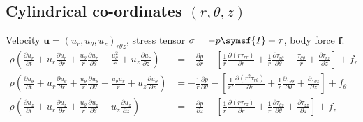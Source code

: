 \documentclass{jknotes}
\begin{document}
\subsection{Cylindrical co-ordinates $(r,\theta,z)$}
Velocity $\symbf{u} = (u_r, u_\theta, u_z)_{r\theta z}$, stress tensor $\sigma
= -p \symsf{I} + \tau$, body force $\symbf{f}$.
\begingroup
\addtolength{\jot}{.7em}
\begin{align}
	\rho\left(\frac{\partial u_r}{\partial t} + u_r \frac{\partial
	u_r}{\partial r} + \frac{u_\theta}{r} \frac{\partial u_r}{\partial \theta} 
	- \frac{u_\theta^2}{r} + u_z\frac{\partial u_r}{\partial z}\right) &= 
	-\frac{\partial p}{\partial r} - \left[ \frac{1}{r}
	\frac{\partial(r\tau_{rr})}{\partial r} + \frac{1}{r}\frac{\partial
	\tau_{r\theta}}{\partial \theta} - \frac{\tau_{\theta\theta}}{r} +
\frac{\partial \tau_{rz}}{\partial z}\right] + f_r \\[-1.4em]
	\rho\left(\frac{\partial u_\theta}{\partial t} + u_r \frac{\partial
	u_\theta}{\partial r} + \frac{u_\theta}{r}\frac{\partial u_\theta}{\partial
	\theta} + \frac{u_\theta u_r}{r} + u_z \frac{\partial
	u_\theta}{\partial z}\right) &= -\frac{1}{r} \frac{\partial p}{\partial
	\theta} - \left[\frac{1}{r^2}\frac{\partial (r^2 \tau_{r\theta})}{\partial
	r} + \frac{1}{r}\frac{\partial \tau_{\theta\theta}}{\partial \theta} +
	\frac{\partial \tau_{\theta z}}{\partial z} \right] + f_{\theta}\\
	\rho\left( \frac{\partial u_z}{\partial t} + u_r \frac{\partial
	u_z}{\partial r} + \frac{u_\theta}{r} \frac{\partial u_z}{\partial
	\theta} + u_z \frac{\partial u_z}{\partial z} \right) &=
	-\frac{\partial p}{\partial z} - \left[ \frac{1}{r}\frac{\partial
	(r\tau_{rz})}{\partial r} + \frac{1}{r}\frac{\partial
	\tau_{\theta z}}{\partial \theta} + \frac{\partial \tau_{zz}}{\partial
	z}\right] + f_z
\end{align}
\endgroup
\end{document}
